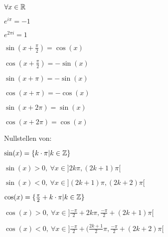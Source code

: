 $\forall x \in \mathbb{R}$
\begin{compactenum}
    \item
        \begin{inparaitem}
            \item $e^{i \pi} = -1$
            \item $e^{2 \pi i} = 1$
        \end{inparaitem}
    \item
        \begin{inparaitem}
            \item $\sin(x + \frac{\pi}{2}) = \cos(x)$
            \item $\cos(x + \frac{\pi}{2}) = - \sin(x)$
        \end{inparaitem}
    \item
        \begin{inparaitem}
            \item $\sin(x + \pi) = - \sin(x)$
            \item $\cos(x + \pi) = - \cos(x)$
        \end{inparaitem}
    \item
        \begin{inparaitem}
            \item $\sin(x + 2 \pi) = \sin(x)$
            \item $\cos(x + 2 \pi) = \cos(x)$
        \end{inparaitem}
    \item Nullstellen von:
        \begin{compactitem}
            \item $\sin(x) = \{k \cdot \pi | k \in \mathbb{Z}\}$
                \begin{inparaitem}
                    \item $\sin(x) > 0, \ \forall x \in ] 2k \pi, (2k+1) \pi[$ 
                    \item $\sin(x) < 0, \ \forall x \in ](2k + 1) \pi, (2k+2) \pi[$
                \end{inparaitem}
            \item $\cos(x) = \{\frac{\pi}{2} + k \cdot \pi | k \in \mathbb{Z}\}$
                \begin{inparaitem}
                \item $\cos(x) > 0, \ \forall x \in ]\frac{-\pi}{2} + 2k\pi, \frac{-\pi}{2} + (2k+1) \pi[$
                \item $\cos(x) < 0, \ \forall x \in ]\frac{-\pi}{2} + (\frac{2k + 1}{2}\pi, \frac{-\pi}{2} + (2k+2) \pi[$
                \end{inparaitem}
        \end{compactitem}
\end{compactenum}

